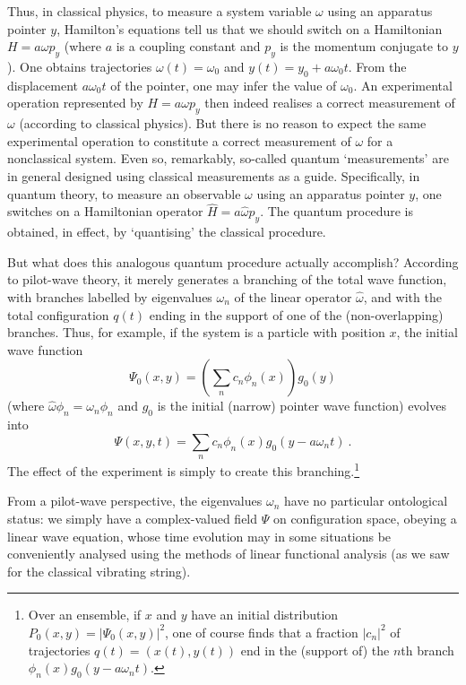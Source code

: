 \documentclass{article}%
\begin{document}
Thus, in classical physics, to measure a system variable $\omega$ using an
apparatus pointer $y$, Hamilton's equations tell us that we should switch on a
Hamiltonian $H=a\omega p_{y}$ (where $a$ is a coupling constant and $p_{y}$ is
the momentum conjugate to $y$). One obtains trajectories $\omega(t)=\omega
_{0}$ and $y(t)=y_{0}+a\omega_{0}t$. From the displacement $a\omega_{0}t$ of
the pointer, one may infer the value of $\omega_{0}$. An experimental
operation represented by $H=a\omega p_{y}$ then indeed realises a correct
measurement of $\omega$ (according to classical physics). But there is no
reason to expect the same experimental operation to constitute a correct
measurement of $\omega$ for a nonclassical system. Even so, remarkably,
so-called quantum `measurements' are in general designed using classical
measurements as a guide. Specifically, in quantum theory, to measure an
observable $\omega$ using an apparatus pointer $y$, one switches on a
Hamiltonian operator $\hat{H}=a\hat{\omega}\hat{p}_{y}$. The quantum procedure
is obtained, in effect, by `quantising' the classical procedure.

But what does this analogous quantum procedure actually accomplish? According
to pilot-wave theory, it merely generates a branching of the total wave
function, with branches labelled by eigenvalues $\omega_{n}$ of the linear
operator $\hat{\omega}$, and with the total configuration $q(t)$ ending in the
support of one of the (non-overlapping) branches. Thus, for example, if the
system is a particle with position $x$, the initial wave function%
\[
\Psi_{0}(x,y)=\left(  \sum_{n}c_{n}\phi_{n}(x)\right)  g_{0}(y)
\]
(where $\hat{\omega}\phi_{n}=\omega_{n}\phi_{n}$ and $g_{0}$ is the initial
(narrow) pointer wave function) evolves into%
\[
\Psi(x,y,t)=\sum_{n}c_{n}\phi_{n}(x)g_{0}(y-a\omega_{n}t)\ .
\]
The effect of the experiment is simply to create this branching.\footnote{Over
an ensemble, if $x$ and $y$ have an initial distribution $P_{0}%
(x,y)=\left\vert \Psi_{0}(x,y)\right\vert ^{2}$, one of course finds that a
fraction $\left\vert c_{n}\right\vert ^{2}$ of trajectories $q(t)=(x(t),y(t))$
end in the (support of) the $n$th branch $\phi_{n}(x)g_{0}(y-a\omega_{n}t)$.}

From a pilot-wave perspective, the eigenvalues $\omega_{n}$ have no particular
ontological status: we simply have a complex-valued field $\Psi$ on
configuration space, obeying a linear wave equation, whose time evolution may
in some situations be conveniently analysed using the methods of linear
functional analysis (as we saw for the classical vibrating string).
\end{document}
